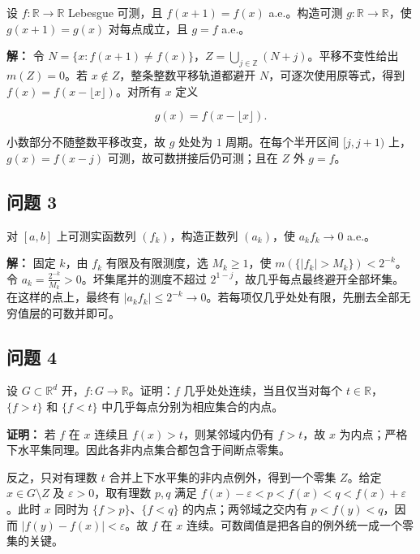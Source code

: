 \documentclass[11pt,a4paper]{article}
\begin{document}
设 \(f:\mathbb R\to\mathbb R\) Lebesgue 可测，且 \(f(x+1)=f(x)\)
a.e.。构造可测 \(g:\mathbb R\to\mathbb R\)，使 \(g(x+1)=g(x)\)
对每点成立，且 \(g=f\) a.e.。

\textbf{解：} 令
\(N=\{x:f(x+1)\ne f(x)\}\)，\(Z=\bigcup_{j\in\mathbb Z}(N+j)\)。平移不变性给出
\(m(Z)=0\)。若 \(x\notin Z\)，整条整数平移轨道都避开
\(N\)，可逐次使用原等式，得到 \(f(x)=f(x-\lfloor x\rfloor)\)。对所有
\(x\) 定义

\begin{equation*}g(x)=f(x-\lfloor x\rfloor).\end{equation*}

小数部分不随整数平移改变，故 \(g\) 处处为 \(1\) 周期。在每个半开区间
\([j,j+1)\) 上，\(g(x)=f(x-j)\) 可测，故可数拼接后仍可测；且在 \(Z\) 外
\(g=f\)。

\subsection{问题 3}\label{ux95eeux9898-3}

对 \([a,b]\) 上可测实函数列 \((f_k)\)，构造正数列 \((a_k)\)，使
\(a_kf_k\to0\) a.e.。

\textbf{解：} 固定 \(k\)，由 \(f_k\) 有限及有限测度，选 \(M_k\ge1\)，使
\(m(\{|f_k|>M_k\})<2^{-k}\)。令
\(a_k=\frac{2^{-k}}{M_k}>0\)。坏集尾并的测度不超过
\(2^{1-j}\)，故几乎每点最终避开全部坏集。在这样的点上，最终有
\(|a_kf_k|\le2^{-k}\to0\)。若每项仅几乎处处有限，先删去全部无穷值层的可数并即可。

\subsection{问题 4}\label{ux95eeux9898-4}

设 \(G\subset\mathbb R^d\) 开，\(f:G\to\mathbb R\)。证明：\(f\)
几乎处处连续，当且仅当对每个 \(t\in\mathbb R\)，\(\{f>t\}\) 和
\(\{f<t\}\) 中几乎每点分别为相应集合的内点。

\textbf{证明：} 若 \(f\) 在 \(x\) 连续且 \(f(x)>t\)，则某邻域内仍有
\(f>t\)，故 \(x\)
为内点；严格下水平集同理。因此各非内点集合都包含于间断点零集。

反之，只对有理数 \(t\) 合并上下水平集的非内点例外，得到一个零集
\(Z\)。给定 \(x\in G\setminus Z\) 及 \(\varepsilon>0\)，取有理数 \(p,q\)
满足 \(f(x)-\varepsilon<p<f(x)<q<f(x)+\varepsilon\)。此时 \(x\) 同时为
\(\{f>p\}\)、\(\{f<q\}\) 的内点；两邻域之交内有 \(p<f(y)<q\)，因而
\(|f(y)-f(x)|<\varepsilon\)。故 \(f\) 在 \(x\)
连续。可数阈值是把各自的例外统一成一个零集的关键。
\end{document}
